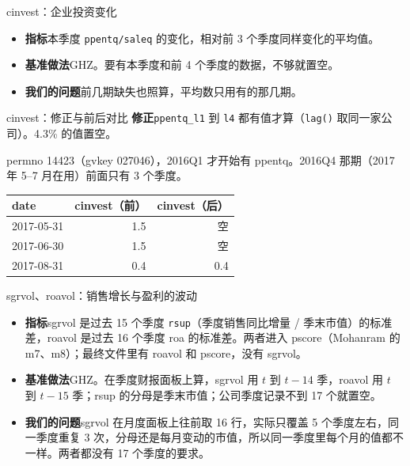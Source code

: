 \documentclass[UTF8,fontset=fandol,aspectratio=169,10pt,t]{ctexbeamer}
\newcommand{\chg}[1]{\textcolor{red!80!black}{#1}}
\newcommand{\kong}{空}
\newcommand{\code}[1]{\texttt{#1}}
\newcommand{\lab}[1]{\textbf{#1}\quad}
\newcommand{\tsize}{\small}
\newcommand{\src}[1]{{\footnotesize\color{black!60}#1}}
\begin{document}
\begin{frame}{cinvest：企业投资变化}
\begin{itemize}
\item \lab{指标}本季度 \code{ppentq/saleq} 的变化，相对前 3 个季度同样变化的平均值。
\item \lab{基准做法}GHZ。要有本季度和前 4 个季度的数据，不够就置空。
\item \lab{我们的问题}前几期缺失也照算，平均数只用有的那几期。
\end{itemize}
\end{frame}

\begin{frame}{cinvest：修正与前后对比}
\lab{修正}\code{ppentq\_l1} 到 \code{l4} 都有值才算（\code{lag()} 取同一家公司）。4.3\% 的值置空。\par\medskip
\src{permno 14423（gvkey 027046），2016Q1 才开始有 ppentq。2016Q4 那期（2017 年 5--7 月在用）前面只有 3 个季度。}\par\smallskip
{\tsize
\begin{tabular}{l rr}
\toprule
date & cinvest（前） & cinvest（后） \\
\midrule
2017-05-31 & 1.5 & \chg{\kong} \\
2017-06-30 & 1.5 & \chg{\kong} \\
2017-08-31 & 0.4 & 0.4 \\
\bottomrule
\end{tabular}}
\end{frame}

\begin{frame}{sgrvol、roavol：销售增长与盈利的波动}
\begin{itemize}
\item \lab{指标}sgrvol 是过去 15 个季度 \code{rsup}（季度销售同比增量 / 季末市值）的标准差，roavol 是过去 16 个季度 roa 的标准差。两者进入 pscore（Mohanram 的 m7、m8）；最终文件里有 roavol 和 pscore，没有 sgrvol。
\item \lab{基准做法}GHZ。在季度财报面板上算，sgrvol 用 $t$ 到 $t-14$ 季，roavol 用 $t$ 到 $t-15$ 季；rsup 的分母是季末市值；公司季度记录不到 17 个就置空。
\item \lab{我们的问题}sgrvol 在月度面板上往前取 16 行，实际只覆盖 5 个季度左右，同一季度重复 3 次，分母还是每月变动的市值，所以同一季度里每个月的值都不一样。两者都没有 17 个季度的要求。
\end{itemize}
\end{frame}
\end{document}
